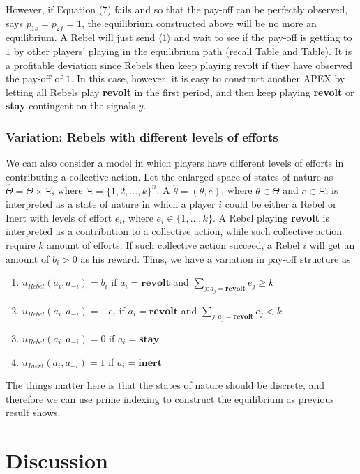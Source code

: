 \documentclass[12pt,letter]{article}
\theoremstyle{definition}
\theoremstyle{remark}
\theoremstyle{claim}
\begin{document}
However, if Equation (7) fails and so that the pay-off can be perfectly observed, says $p_{1s}=p_{2f}=1$, the equilibrium constructed above will be no more an equilibrium. A Rebel will just send $\langle 1 \rangle$ and wait to see if the pay-off is getting to $1$ by other players' playing in the equilibrium path (recall Table and Table). It is a profitable deviation since Rebels then keep playing revolt if they have observed the pay-off of $1$. In this case, however, it is easy to construct another APEX by letting all Rebels play \textbf{revolt} in the first period, and then keep playing \textbf{revolt} or \textbf{stay} contingent on the signals $y$.

\subsubsection{Variation: Rebels with different levels of efforts}

We can also consider a model in which players have different levels of efforts in contributing a collective action. Let the enlarged space of states of nature as $\hat{\Theta}=\Theta \times \Xi$, where $\Xi=\{1,2,...,k\}^n$. A $\hat{\theta}=(\theta,e)$, where $\theta\in \Theta$ and $e\in \Xi$, is interpreted as a state of nature in which a player $i$ could be either a Rebel or Inert with levels of effort $e_i$, where $e_i\in \{1,...,k\}$. A Rebel playing \textbf{revolt} is interpreted as a contribution to a collective action, while such collective action require $k$ amount of efforts. If such collective action succeed, a Rebel $i$ will get an amount of $b_i>0$ as his reward. Thus, we have a variation in pay-off structure as
\begin{enumerate}
\item $u_{Rebel}(a_i,a_{-i})=b_i$ if $a_i=\textbf{revolt}$ and $\sum_{j:a_j=\textbf{revolt}}e_j\geq k$
\item $u_{Rebel}(a_i,a_{-i})=-e_i$ if $a_i=\textbf{revolt}$ and $\sum_{j:a_j=\textbf{revolt}}e_j< k$
\item $u_{Rebel}(a_i,a_{-i})=0$ if $a_i=\textbf{stay}$
\item $u_{Inert}(a_i,a_{-i})=1$ if $a_i=\textbf{inert}$
\end{enumerate}

The things matter here is that the states of nature should be discrete, and therefore we can use prime indexing to construct the equilibrium as previous result shows.

\section{Discussion}
\label{sec:discuss}
\end{document}
